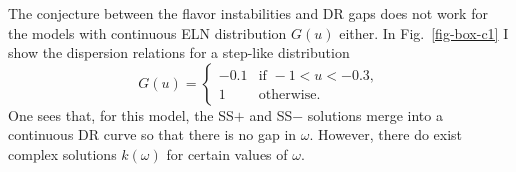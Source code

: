 The conjecture between the flavor instabilities and DR gaps does not work for the models with continuous ELN distribution $G(u)$ either. In Fig.~\ref{fig-box-c1} I show the dispersion relations for a step-like distribution
\begin{equation}
G(u) = \begin{cases}
-0.1 &  \text{if } -1 < u < -0.3, \\
1 &  \text{otherwise.}
\end{cases}
\label{chap:collective-sec:gap-eqn:eln-step-like}
\end{equation}
One sees that, for this model, the SS$+$ and SS$-$ solutions merge into a continuous DR curve so that there is no gap in $\omega$. However, there do exist complex solutions $k(\omega)$ for certain values of $\omega$.


%



